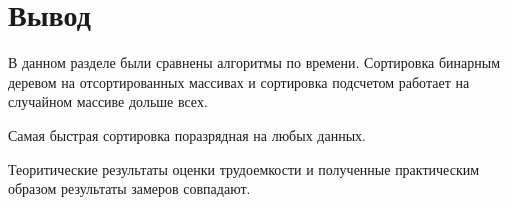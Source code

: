 \newpage

\section*{Вывод}

В данном разделе были сравнены алгоритмы по времени.
Сортировка бинарным деревом на отсортированных массивах и сортировка подсчетом работает на случайном массиве дольше всех.

Самая быстрая сортировка поразрядная на любых данных.


Теоритические результаты оценки трудоемкости и полученные практическим образом результаты замеров совпадают. 
